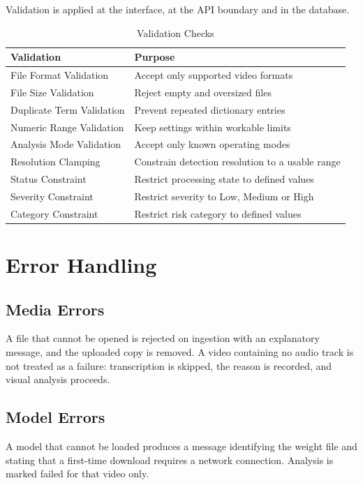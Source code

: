 \documentclass[12pt,a4paper,twoside]{report}
\begin{document}
Validation is applied at the interface, at the API boundary and in the database.

\begin{table}[h]
\centering
\begin{tabular}{|p{5cm}|p{6cm}|}
\hline
\textbf{Validation} & \textbf{Purpose} \\
\hline
File Format Validation & Accept only supported video formats \\
\hline
File Size Validation & Reject empty and oversized files \\
\hline
Duplicate Term Validation & Prevent repeated dictionary entries \\
\hline
Numeric Range Validation & Keep settings within workable limits \\
\hline
Analysis Mode Validation & Accept only known operating modes \\
\hline
Resolution Clamping & Constrain detection resolution to a usable range \\
\hline
Status Constraint & Restrict processing state to defined values \\
\hline
Severity Constraint & Restrict severity to Low, Medium or High \\
\hline
Category Constraint & Restrict risk category to defined values \\
\hline
\end{tabular}
\caption{Validation Checks}
\end{table}

\section{Error Handling}

\subsection{Media Errors}

A file that cannot be opened is rejected on ingestion with an explanatory message, and the uploaded copy is removed. A video containing no audio track is not treated as a failure: transcription is skipped, the reason is recorded, and visual analysis proceeds.

\subsection{Model Errors}

A model that cannot be loaded produces a message identifying the weight file and stating that a first-time download requires a network connection. Analysis is marked failed for that video only.
\end{document}
